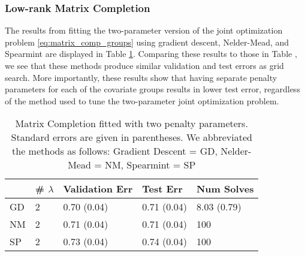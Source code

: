 \documentclass[12pt,letterpaper]{article}
\begin{document}
\subsubsection{Low-rank Matrix Completion}
The results from fitting the two-parameter version of the joint optimization problem \eqref{eq:matrix_comp_groups} using gradient descent, Nelder-Mead, and Spearmint are displayed in Table \ref{table:two_param_matrix_completion}. Comparing these results to those in Table \label{table:matrix_completion}, we see that these methods produce similar validation and test errors as grid search. More importantly, these results show that having separate penalty parameters for each of the covariate groups results in lower test error, regardless of the method used to tune the two-parameter joint optimization problem.

\begin{table}
	\caption{\label{table:two_param_matrix_completion} Matrix Completion fitted with two penalty parameters. Standard errors are given in parentheses. We abbreviated the methods as follows: Gradient Descent = GD, Nelder-Mead = NM, Spearmint = SP}
	\centering
	\begin{tabular}{| l | l | l | l | l |}
		\hline
		& \# $\lambda$ & Validation Err & Test Err &  Num Solves\\
		\hline
		GD & 2 & 0.70 (0.04) &  0.71 (0.04) & 8.03 (0.79) \\
		\hline
		NM & 2 & 0.71 (0.04) & 0.71 (0.04) & 100 \\
		\hline
		SP & 2 & 0.73 (0.04) & 0.74 (0.04) & 100\\
		\hline
	\end{tabular}
\end{table}



\end{document}
